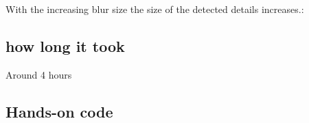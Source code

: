 \documentclass{article}
\begin{document}
 \par
With the increasing blur size the size of the detected details increases.:

\subsection{how long it took}
Around 4 hours

\subsection{Hands-on code}
\end{document}
